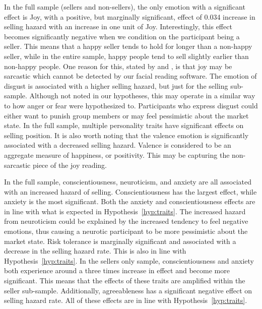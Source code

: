 \documentclass[thesis]{uathesis}
\begin{document}
\begin{body}
In the full sample (sellers and non-sellers), the only emotion with a significant effect is Joy, with a positive, but marginally significant, effect of 0.034 increase in selling hazard with an increase in one unit of Joy. Interestingly, this effect becomes significantly negative when we condition on the participant being a seller. This means that a happy seller tends to hold for longer than a non-happy seller, while in the entire sample, happy people tend to sell slightly earlier than non-happy people. One reason for this, stated by \cite{forman2020capturing} and \cite{hoque2012exploring}, is that joy may be sarcastic which cannot be detected by our facial reading software. The emotion of disgust is associated with a higher selling hazard, but just for the selling sub-sample. Although not noted in our hypotheses, this may operate in a similar way to how anger or fear were hypothesized to. Participants who express disgust could either want to punish group members or may feel pessimistic about the market state.
In the full sample, multiple personality traits have significant effects on selling position. It is also worth noting that the valence emotion is significantly associated with a decreased selling hazard. Valence is considered to be an aggregate measure of happiness, or positivity. This may be capturing the non-sarcastic piece of the joy reading.

In the full sample, conscientiousness, neuroticism, and anxiety are all associated with an increased hazard of selling. Conscientiousness has the largest effect, while anxiety is the most significant. Both the anxiety and conscientiousness effects are in line with what is expected in Hypothesis~\ref{hyp:traits}. The increased hazard from neuroticism could be explained by the increased tendency to feel negative emotions, thus causing a neurotic participant to be more pessimistic about the market state. Risk tolerance is marginally significant and associated with a decrease in the selling hazard rate. This is also in line with Hypothesis~\ref{hyp:traits}.
In the sellers only sample, conscientiousness and anxiety both experience around a three times increase in effect and become more significant. This means that the effects of these traits are amplified within the seller sub-sample. Additionally, agreeableness has a significant negative effect on selling hazard rate. All of these effects are in line with Hypothesis~\ref{hyp:traits}.


\begin{table}[H]
  \centering
  \caption{Tobit regression: number of sellers per group-round}
  \label{tab:tobit_n_sellers}
  
\end{table}


\end{body}
\end{document}

